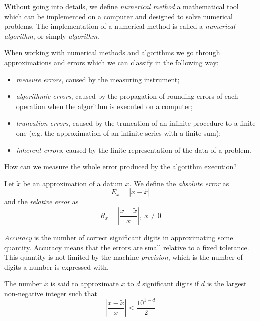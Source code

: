 Without going into details, we define \textit{numerical method} a mathematical tool which can be implemented on a computer and designed to solve numerical problems. The implementation of a numerical method is called a \textit{numerical algorithm}, or simply \textit{algorithm}.

When working with numerical methods and algorithms we go through approximations and errors which we can classify in the following way:

\begin{itemize}
    \item \textit{measure errors}, caused by the measuring instrument;
    \item \textit{algorithmic errors}, caused by the propagation of rounding errors of each operation when the algorithm is executed on a computer;
    \item \textit{truncation errors}, caused by the truncation of an infinite procedure to a finite one (e.g. the approximation of an infinite series with a finite sum);
    \item \textit{inherent errors}, caused by the finite representation of the data of a problem.
\end{itemize}

How can we measure the whole error produced by the algorithm execution?

\begin{definition}
    Let $\tilde{x}$ be an approximation of a datum $x$. We define the \textit{absolute error} as
    $$ E_x = |x - \tilde{x}| $$
    and the \textit{relative error} as
    $$ R_x = \left| \frac{x - \tilde{x}}{x} \right|,\ x \neq 0 $$
\end{definition}


\begin{definition}
    \textit{Accuracy} is the number of correct significant digits in approximating some quantity. Accuracy means that the errors are small relative to a fixed tolerance. This quantity is not limited by the machine \textit{precision}, which is the number of digits a number is expressed with.
\end{definition}

\begin{definition}
    The number $\tilde{x}$ is said to approximate $x$ to $d$ significant digits if $d$ is the largest non-negative integer such that
    $$ \left| \frac{x - \tilde{x}}{x} \right| < \frac{10^{1-d}}{2} $$
\end{definition}

